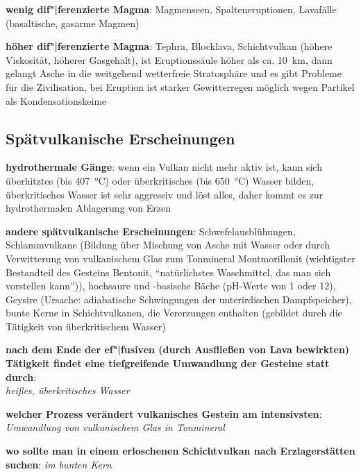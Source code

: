 \textbf{wenig dif"|ferenzierte Magma}:
Magmenseen, Spalteneruptionen, Lavafälle
(basaltische, gasarme Magmen)

\textbf{höher dif"|ferenzierte Magma}:
Tephra, Blocklava, Schichtvulkan
(höhere Viskosität, höherer Gasgehalt),
ist Eruptionssäule höher als ca. \SI{10}{\kilo\meter}, dann gelangt Asche in
die weitgehend wetterfreie Stratosphäre und es gibt Probleme für die Zivilisation,
bei Eruption ist starker Gewitterregen möglich wegen Partikel als Kondensationskeime

\subsection{%
    Spätvulkanische Erscheinungen%
}

\textbf{hydrothermale Gänge}:
wenn ein Vulkan nicht mehr aktiv ist,
kann sich überhitztes (bis \SI{407}{\celsius}) oder überkritisches (bis \SI{650}{\celsius})
Wasser bilden,
überkritisches Wasser ist sehr aggressiv und löst alles,
daher kommt es zur hydrothermalen Ablagerung von Erzen

\textbf{andere spätvulkanische Erscheinungen}:
Schwefelausblühungen,
Schlammvulkane
(Bildung über Mischung von Asche mit Wasser oder
durch Verwitterung von vulkanischem Glas zum Tonmineral Montmorillonit
(wichtigster Bestandteil des Gesteins Bentonit,
"`natürlichstes Waschmittel, das man sich vorstellen kann"')),
hochsaure und -basische Bäche (pH-Werte von 1 oder 12),
Geysire (Ursache: adiabatische Schwingungen der unterirdischen Dampfspeicher),
bunte Kerne in Schichtvulkanen, die Vererzungen enthalten
(gebildet durch die Tätigkeit von überkritischem Wasser)

\begin{wichtig}
    \item
    \textbf{nach dem Ende der ef"|fusiven (durch Ausfließen von Lava bewirkten) Tätigkeit findet
    eine tiefgreifende Umwandlung der Gesteine statt durch}:\\
    \emph{heißes, überkritisches Wasser}

    \item
    \textbf{welcher Prozess verändert vulkanisches Gestein am intensivsten}:\\
    \emph{Umwandlung von vulkanischem Glas in Tonmineral}

    \item
    \textbf{wo sollte man in einem erloschenen Schichtvulkan nach Erzlagerstätten suchen}:
    \emph{im bunten Kern}
\end{wichtig}

